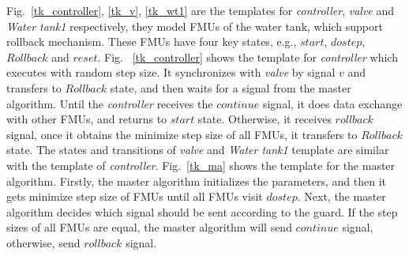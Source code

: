 \begin{figure}[htbp]
\end{figure}

Fig.~\ref{tk_controller}, \ref{tk_v}, \ref{tk_wt1} are the templates for \emph{controller}, \emph{valve} and \emph{Water tank1} respectively, they model FMUs of the water tank,  which support rollback mechanism. These FMUs have four key states, e.g., $start$, $dostep$, $Rollback$ and $reset$. Fig.~ \ref{tk_controller} shows the template for \emph{controller} which executes with random step size. It synchronizes with \emph{valve} by signal $v$ and transfers to $Rollback$ state, and then waits for a signal from the master algorithm. Until the \emph{controller} receives the $continue$ signal, it does data exchange with other FMUs, and returns to $start$ state. Otherwise, it receives $rollback$ signal, once it obtains the minimize step size of all FMUs, it transfers to $Rollback$ state. The states and transitions of \emph{valve} and \emph{Water tank1} template are similar with the template of \emph{controller}. Fig.~\ref{tk_ma} shows the template for the master algorithm. Firstly, the master algorithm initializes the parameters, and then it gets minimize step size of FMUs until all FMUs visit $dostep$. Next, the master algorithm decides which signal should be sent according to the guard. If the step sizes of all FMUs are equal, the master algorithm will send $continue$ signal, otherwise, send $rollback$ signal.

